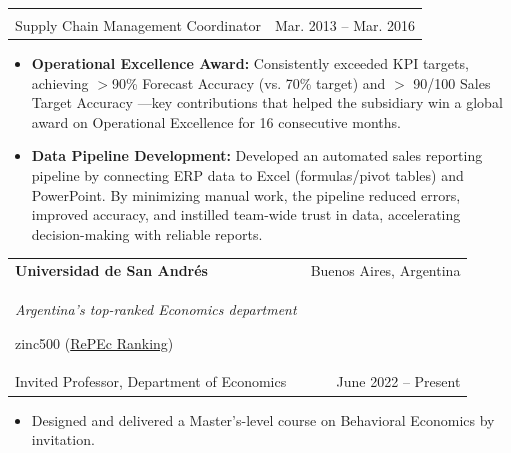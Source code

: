 \documentclass[letterpaper,11pt]{article}
\makeatletter
\newcommand{\link}[2]{{\color{NavyBlue}\href{#1}{#2}}}
\newcommand{\citecolor}[1]{%
  {\footnotesize\begin{color}{zinc500}%
    #1%
  \end{color}}%
}
\newcommand{\resumeItem}[1]{
  \item\small{
    {#1 \vspace{-2pt}}
  }
}
\newcommand{\resumeSubheading}[4]{
  \vspace{0pt}\item
    \begin{tabular*}{0.97\textwidth}[t]{l@{\extracolsep{\fill}}r}
      \textbf{#1} & #2 \\
      \small#3 & \small#4 \\
    \end{tabular*}\vspace{-5pt}
}
\newcommand{\resumeItemListStart}{\begin{itemize}}
\newcommand{\resumeItemListEnd}{\end{itemize}\vspace{-5pt}}
\makeatother
\begin{document}
    \vspace{-1.5em}
    \resumeSubheading{}{}
    {Supply Chain Management Coordinator}{Mar. 2013 -- Mar. 2016}
    \resumeItemListStart
       \resumeItem{\textbf{Operational Excellence Award:} 
       Consistently exceeded KPI targets, achieving $>$90\% Forecast Accuracy (vs. 70\% target) and $>$ 90/100 Sales Target Accuracy ---key contributions that helped the subsidiary win a global award on Operational Excellence for 16 consecutive months.
      }
       \resumeItem{\textbf{Data Pipeline Development:} Developed an automated sales reporting pipeline by connecting ERP data to Excel (formulas/pivot tables) and PowerPoint. By minimizing manual work, the pipeline reduced errors, improved accuracy, and instilled team-wide trust in data, accelerating decision-making with reliable reports.}
    \resumeItemListEnd
  
    \resumeSubheading
      {Universidad de San Andrés}{Buenos Aires, Argentina}
      {\textit{\mdseries Argentina's top-ranked Economics department} \citecolor{(\link{https://ideas.repec.org/top/top.argentina.html}{RePEc Ranking})}\\Invited Professor, Department of Economics}{June 2022 -- Present} 
      \resumeItemListStart
        \resumeItem{Designed and delivered a Master's-level course on Behavioral Economics by invitation.}
      \resumeItemListEnd
    
\end{document}
